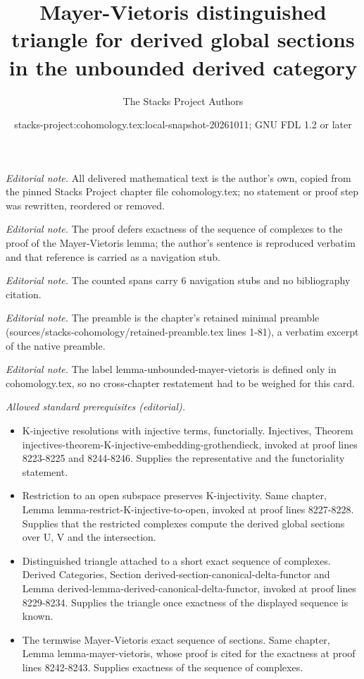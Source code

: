 \documentclass[10pt,a4paper]{amsart}
\title{Mayer-Vietoris distinguished triangle for derived global sections in the unbounded derived category}
\author{The Stacks Project Authors}
\date{stacks-project:cohomology.tex:local-snapshot-20261011; GNU FDL 1.2 or later}
\theoremstyle{plain}
\theoremstyle{definition}
\theoremstyle{remark}
\numberwithin{equation}{subsection}
\begin{document}
\maketitle
\noindent\textit{Editorial note.} All delivered mathematical text is the author's own, copied from the pinned Stacks Project chapter file cohomology.tex; no statement or proof step was rewritten, reordered or removed.\par\medskip
\noindent\textit{Editorial note.} The proof defers exactness of the sequence of complexes to the proof of the Mayer-Vietoris lemma; the author's sentence is reproduced verbatim and that reference is carried as a navigation stub.\par\medskip
\noindent\textit{Editorial note.} The counted spans carry 6 navigation stubs and no bibliography citation.\par\medskip
\noindent\textit{Editorial note.} The preamble is the chapter's retained minimal preamble (sources/stacks-cohomology/retained-preamble.tex lines 1-81), a verbatim excerpt of the native preamble.\par\medskip
\noindent\textit{Editorial note.} The label lemma-unbounded-mayer-vietoris is defined only in cohomology.tex, so no cross-chapter restatement had to be weighed for this card.\par\medskip
\noindent\textit{Allowed standard prerequisites (editorial).}\begin{itemize}
\item K-injective resolutions with injective terms, functorially. Injectives, Theorem injectives-theorem-K-injective-embedding-grothendieck, invoked at proof lines 8223-8225 and 8244-8246. Supplies the representative and the functoriality statement.
\item Restriction to an open subspace preserves K-injectivity. Same chapter, Lemma lemma-restrict-K-injective-to-open, invoked at proof lines 8227-8228. Supplies that the restricted complexes compute the derived global sections over U, V and the intersection.
\item Distinguished triangle attached to a short exact sequence of complexes. Derived Categories, Section derived-section-canonical-delta-functor and Lemma derived-lemma-derived-canonical-delta-functor, invoked at proof lines 8229-8234. Supplies the triangle once exactness of the displayed sequence is known.
\item The termwise Mayer-Vietoris exact sequence of sections. Same chapter, Lemma lemma-mayer-vietoris, whose proof is cited for the exactness at proof lines 8242-8243. Supplies exactness of the sequence of complexes.
\end{itemize}\medskip
\end{document}
